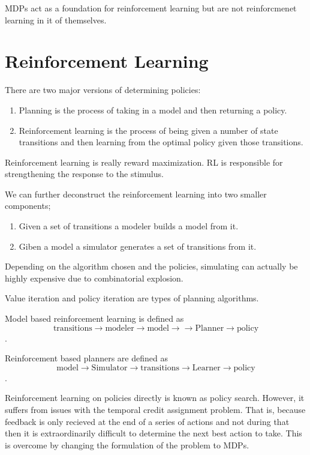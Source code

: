 \documentclass{article}
\begin{document}
MDPs act as a foundation for reinforcement learning but are not reinforcmenet
learning in it of themselves.

\section{Reinforcement Learning}

There are two major versions of determining policies:
\begin{enumerate}
    \item Planning is the process of taking in a model and then returning a
    policy.
    \item Reinforcement learning is the process of being given a number of
    state transitions and then learning from the optimal policy given those
    transitions.
\end{enumerate}

Reinforcement learning is really reward maximization. RL is responsible for
strengthening the response to the stimulus.

We can further deconstruct the reinforcement learning into two smaller
components;
\begin{enumerate}
        \item Given a set of transitions a modeler builds a model from it.
        \item Giben a model a simulator generates a set of transitions from it.
\end{enumerate}

Depending on the algorithm chosen and the policies, simulating can actually
be highly expensive due to combinatorial explosion.

Value iteration and policy iteration are types of planning algorithms.

Model based reinforcement learning is defined as $$\text{transitions}
\rightarrow \text{modeler} \rightarrow \text{model} \rightarrow \rightarrow
\text{Planner} \rightarrow \text{policy}$$.

Reinforcement based planners are defined as $$\text{model} \rightarrow
\text{Simulator} \rightarrow \text{transitions} \rightarrow \text{Learner}
\rightarrow \text{policy}$$.

Reinforcement learning on policies directly is known as policy search. However,
it suffers from issues with the temporal credit assignment problem. That is,
because feedback is only recieved at the end of a series of actions and not
during that then it is extraordinarily difficult to determine the next best
action to take. This is overcome by changing the formulation of the problem
to MDPs.
\end{document}
